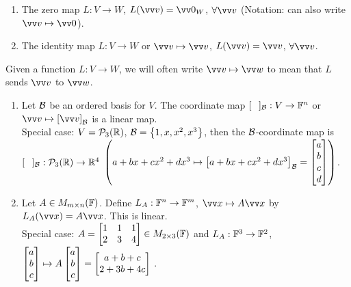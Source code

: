 \begin{example}
    \phantom{}
    \begin{enumerate}
        \item The zero map $L:V\to W$, $L(\vvv) = \vzero_W$, $\forall \vvv$ (Notation: can also write $\vvv \mapsto \vzero$).
        \item The identity map $L:V\to W$ or $\vvv \mapsto \vvv$, $L(\vvv) = \vvv$, $\forall \vvv$.
    \end{enumerate}
\end{example}

\begin{remark}
    Given a function $L:V \to W$, we will often write $\vvv \mapsto \vw$ to mean that $L$ sends $\vvv$ to $\vw$.
\end{remark}

\begin{example}
    \phantom{}
    \begin{enumerate}
        \item Let $\mathcal{B}$ be an ordered basis for $V$. The coordinate map $[\phantom{A}]_{\mathcal{B}} : V \to {\mathbb{F}}^n$ or $\vvv \mapsto \left[ \vvv \right]_{\mB}$ is a linear map. \\
        Special case: $V = \mathcal{P}_3({\mathbb{R}})$, $\mathcal{B} = \left\{ 1,x,x^2,x^3 \right\}$, then the $\mathcal{B}$-coordinate map is
        $[\phantom{A}]_{\mathcal{B}} : \mathcal{P}_3({\mathbb{R}}) \to {\mathbb{R}}^4$ $\left( a+bx+cx^2 + dx^3 \mapsto \left[ a+bx+cx^2 + dx^3 \right]_{\mathcal{B}} = \begin{bmatrix} a \\ b \\ c \\d \end{bmatrix} \right)$.
        \item Let $A \in M_{m \times n}({\mathbb{F}})$. Define $L_A: {\mathbb{F}}^n \to {\mathbb{F}}^m$, $\vx \mapsto A\vx$ by $L_A(\vx) = A\vx$. This is linear. \\
        Special case: $A = \begin{bmatrix} 1 & 1 & 1 \\ 2 & 3 & 4 \end{bmatrix} \in M_{2 \times 3}({\mathbb{F}})$ and $L_A: {\mathbb{F}}^3 \to {\mathbb{F}}^2$, $\begin{bmatrix} a \\ b \\ c \end{bmatrix} \mapsto A\begin{bmatrix} a \\ b \\ c \end{bmatrix} = \begin{bmatrix} a+b+c \\ 2+3b+4c \end{bmatrix}$ .
    \end{enumerate}
\end{example}

